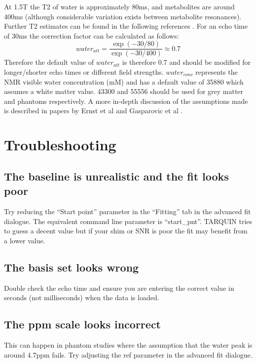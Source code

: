 \documentclass[a4paper,12pt]{article}
\begin{document}
At 1.5T the T2 of water is approximately 80ms, and metabolites are around 400ms (although considerable variation exists between metabolite resonances). Further T2 estimates can be found in the following references \cite{metab_t2_3t,water_relaxation}. For an echo time of 30ms the correction factor can be calculated as follows:
\begin{equation}
water_{att} = \frac{\exp(-30/80)}{\exp(-30/400)} \approx 0.7
\end{equation}
Therefore the default value of $water_{att}$ is therefore 0.7 and should be modified for longer/shorter echo times or different field strengths. $water_{conc}$ represents the NMR visible water concentration (mM) and has a default value of 35880 which assumes a white matter value. 43300 and 55556 should be used for grey matter and phantoms respectively. A more in-depth discussion of the assumptions made is described in papers by Ernst et al \cite{water_ref} and Gasparovic et al \cite{csi_water_ref}.


\section{Troubleshooting}
\subsection{The baseline is unrealistic and the fit looks poor}
Try reducing the ``Start point'' parameter in the ``Fitting'' tab in the advanced fit dialogue.  The equivalent command line parameter is ``start\_pnt''. TARQUIN tries to guess a decent value but if your shim or SNR is poor the fit may benefit from a lower value.

\subsection{The basis set looks wrong}
Double check the echo time and ensure you are entering the correct value in seconds (not milliseconds) when the data is loaded.

\subsection{The ppm scale looks incorrect}
This can happen in phantom studies where the assumption that the water peak is around 4.7ppm fails. Try adjusting the ref parameter in the advanced fit dialogue.

\end{document}
